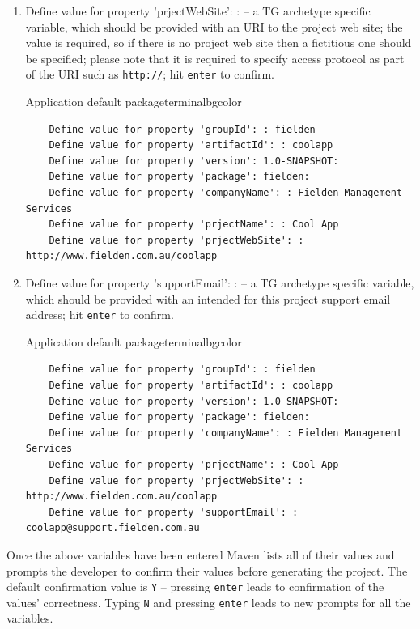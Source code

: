 \begin{enumerate}
    \item Define value for property 'prjectWebSite': : -- a TG archetype specific variable, which should be provided with an URI to the project web site; the value is required, so if there is no project web site then a fictitious one should be specified; please note that it is required to specify access protocol as part of the URI such as \texttt{http://}; hit \texttt{enter} to confirm.
    \vspace*{-20pt}
    \begin{code}{Application default package}{\label{lst::archetype-package}}{terminalbgcolor}
      \begin{lstlisting}
	Define value for property 'groupId': : fielden		
	Define value for property 'artifactId': : coolapp
	Define value for property 'version': 1.0-SNAPSHOT:
	Define value for property 'package': fielden:	
	Define value for property 'companyName': : Fielden Management Services
	Define value for property 'prjectName': : Cool App
	Define value for property 'prjectWebSite': : http://www.fielden.com.au/coolapp
      \end{lstlisting}
    \end{code}

    \item Define value for property 'supportEmail': : -- a TG archetype specific variable, which should be provided with an intended for this project support email address; hit \texttt{enter} to confirm.
    \vspace*{-20pt}
    \begin{code}{Application default package}{\label{lst::archetype-package}}{terminalbgcolor}
      \begin{lstlisting}
	Define value for property 'groupId': : fielden		
	Define value for property 'artifactId': : coolapp
	Define value for property 'version': 1.0-SNAPSHOT:
	Define value for property 'package': fielden:	
	Define value for property 'companyName': : Fielden Management Services
	Define value for property 'prjectName': : Cool App
	Define value for property 'prjectWebSite': : http://www.fielden.com.au/coolapp
	Define value for property 'supportEmail': : coolapp@support.fielden.com.au
      \end{lstlisting}
    \end{code}

  \end{enumerate}

  Once the above variables have been entered Maven lists all of their values and prompts the developer to confirm their values before generating the project. 
  The default confirmation value is \texttt{Y} -- pressing \texttt{enter} leads to confirmation of the values' correctness. 
  Typing \texttt{N} and pressing \texttt{enter} leads to new prompts for all the variables.

